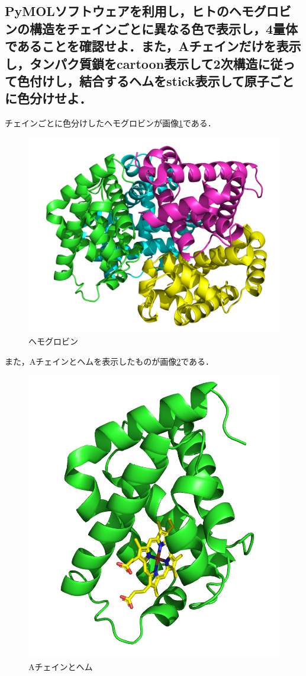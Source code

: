 \documentclass[uplatex,a4j]{jsarticle}
\begin{document}
  \subsection{PyMOLソフトウェアを利用し，ヒトのヘモグロビンの構造をチェインごとに異なる色で表示し，4量体であることを確認せよ．また，Aチェインだけを表示し，タンパク質鎖をcartoon表示して2次構造に従って色付けし，結合するヘムをstick表示して原子ごとに色分けせよ．}
  チェインごとに色分けしたヘモグロビンが画像\ref{2_6_1}である．
  \begin{figure}[H]
    \begin{center}
      \includegraphics[width=12cm]{1BUW.png}
      \caption{ヘモグロビン}
      \label{2_6_1}
    \end{center}
  \end{figure}
  また，Aチェインとヘムを表示したものが画像\ref{2_6_2}である．
  \begin{figure}[H]
    \begin{center}
      \includegraphics[width=12cm]{hem.png}
      \caption{Aチェインとヘム}
      \label{2_6_2}
    \end{center}
  \end{figure}
  
\end{document}
